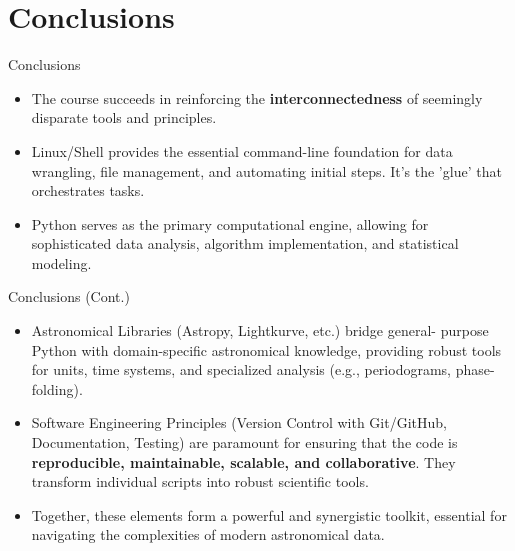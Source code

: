 \documentclass[12pt, aspectratio=169]{beamer}
\renewcommand{\large}{\fontsize{14}{17}\selectfont}
\begin{document}
  \section{Conclusions}
  \begin{frame}[t]{Conclusions}
    \begin{itemize} \large
      \item The course succeeds in reinforcing the \textbf{interconnectedness} of seemingly disparate
      tools and principles. \vspace{2.5mm}
      \item Linux/Shell provides the essential command-line foundation
      for data wrangling, file management, and automating initial steps. It's
      the 'glue' that orchestrates tasks. \vspace{2.5mm}
      \item Python serves as the primary computational engine, allowing for
      sophisticated data analysis, algorithm implementation, and statistical
      modeling.
    \end{itemize}
  \end{frame}

  \begin{frame}[t]{Conclusions (Cont.)}
    \begin{itemize} \large
      \item Astronomical Libraries (Astropy, Lightkurve, etc.) bridge general-
      purpose Python with domain-specific astronomical knowledge, providing
      robust tools for units, time systems, and specialized analysis (e.g.,
      periodograms, phase-folding). \vspace{2.5mm}
      \item Software Engineering Principles (Version Control with Git/GitHub,
      Documentation, Testing) are paramount for ensuring that the code is
      \textbf{reproducible, maintainable, scalable, and collaborative}. They
      transform individual scripts into robust scientific tools. \vspace{2.5mm}
      \item Together, these elements form a powerful and synergistic toolkit,
      essential for navigating the complexities of modern astronomical data.
    \end{itemize} \vspace{2.5mm}
  \end{frame}
\end{document}
